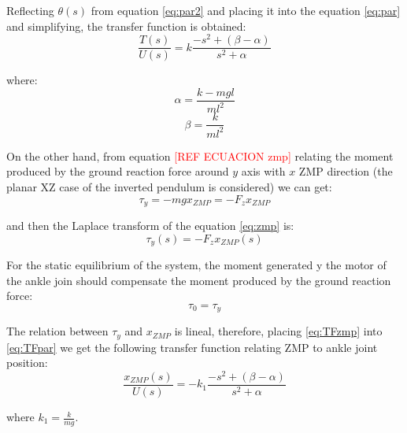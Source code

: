 Reflecting $\theta(s)$ from equation \ref{eq:par2} and placing it into the equation \ref{eq:par} and simplifying, the transfer function is obtained:
\begin{equation}
\frac{T(s)}{U(s)} = k \frac{-s^2+(\beta - \alpha)}{s^2 + \alpha}
\label{eq:TFpar}
\end{equation}

where:
\begin{equation}
\alpha = \frac{k-mgl}{ml^2}
\end{equation}
\begin{equation}
\beta = \frac{k}{ml^2}
\end{equation}

On the other hand, from equation \textcolor{red}{[REF ECUACION zmp]} relating the moment produced by the ground reaction force around $y$ axis with $x$ ZMP direction (the planar XZ case of the inverted pendulum is considered) we can get:
\begin{equation}
\tau_y = -mgx_{ZMP} = - F_z x_{ZMP}
\label{eq:zmp}
\end{equation} 

and then the Laplace transform of the equation \ref{eq:zmp} is:
\begin{equation}
\tau_y(s) = - F_z x_{ZMP}(s)
\label{eq:TFzmp}
\end{equation}

For the static equilibrium of the system, the moment generated y the motor of the ankle join should compensate the moment produced by the ground reaction force:
\begin{equation}
\tau_0 = \tau_y
\end{equation}

The relation between $\tau_y$ and $x_{ZMP}$ is lineal, therefore, placing \ref{eq:TFzmp} into \ref{eq:TFpar} we get the following transfer function relating ZMP to ankle joint position: 
\begin{equation}
\frac{x_{ZMP}(s)}{U(s)} = - k_1 \frac{-s^2+(\beta - \alpha)}{s^2 + \alpha}
\end{equation}

where $k_1 = \frac{k}{mg}$.

